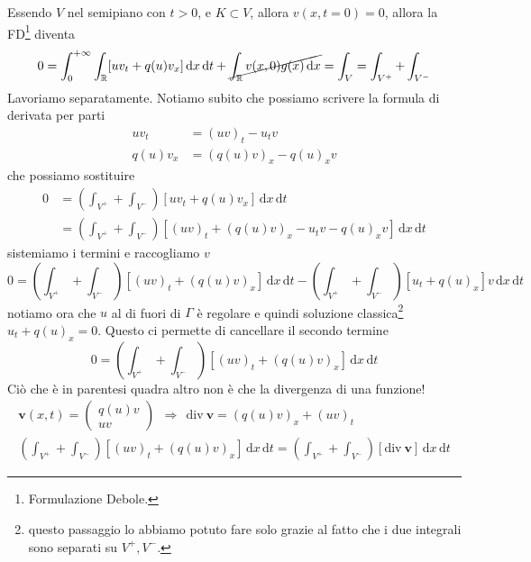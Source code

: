 \documentclass[10pt,a4paper,twoside,openright]{book}
\newcommand{\de}{\,\mathrm d}
\newcommand{\dx}{\de x}
\newcommand{\dt}{\de t}
\begin{document}
\begin{dimostrazione}
\begin{figure}[H]
\begin{tikzpicture}[x=0.75pt,y=0.75pt,yscale=-1,xscale=1]
		\end{tikzpicture}
	\end{figure}
	\FloatBarrier

	Essendo $V$ nel semipiano con $t >0$, e $K\subset V$, allora $v(x,t=0) =0$, allora la FD\footnote{Formulazione Debole.} diventa
	\begin{equation*}
		0=\int ^{+\infty }_{0}\int _{\mathbb{R}}[ uv_{t} +q(u) v_{x}] \dx\dt+\cancel{\int _{\mathbb{R}} v(x,0) g(x) \dx} =\int _{V} =\int _{V^{+}} +\int _{V^{-}}
	\end{equation*}
	Lavoriamo separatamente. Notiamo subito che possiamo scrivere la formula di derivata per parti
	\begin{align*}
		uv_{t}      & =(uv)_{t} -u_{t} v          \\
		q(u) v_{x} & =(q(u) v)_{x} -q(u)_{x} v 
	\end{align*}
	che possiamo sostituire
	\begin{align*}
		0 & =\left(\int _{V^{+}} +\int _{V^{-}}\right)[ uv_{t} +q(u) v_{x}] \dx\dt                           \\
		  & =\left(\int _{V^{+}} +\int _{V^{-}}\right)[(uv)_{t} +(q(u) v)_{x} -u_{t} v-q(u)_{x} v] \dx\dt 
	\end{align*}
	sistemiamo i termini e raccogliamo $v$
	\begin{equation*}
		0=\left(\int _{V^{+}} +\int _{V^{-}}\right)[(uv)_{t} +(q(u) v)_{x}] \dx\dt-\left(\int _{V^{+}} +\int _{V^{-}}\right)[ u_{t} +q(u)_{x}] v\dx\dt
	\end{equation*}
	notiamo ora che $u$ al di fuori di $\Gamma $ è regolare e quindi soluzione classica\footnote{questo passaggio lo abbiamo potuto fare solo grazie al fatto che i due integrali sono separati su $V^{+} ,V^{-}$.} $u_{t} +q(u)_{x} =0$. Questo ci permette di cancellare il secondo termine
	\begin{equation*}
		0=\left(\int _{V^{+}} +\int _{V^{-}}\right)[(uv)_{t} +(q(u) v)_{x}] \dx\dt
	\end{equation*}
	Ciò che è in parentesi quadra altro non è che la divergenza di una funzione!
	\begin{gather*}
		\mathbf{v}(x,t) =
		\begin{pmatrix}
			q(u) v \\
			uv      
		\end{pmatrix} \ \ \Rightarrow \ \ \mathrm{div} \ \mathbf{v} =(q(u) v)_{x} +(uv)_{t}\\
		\left(\int _{V^{+}} +\int _{V^{-}}\right)[(uv)_{t} +(q(u) v)_{x}] \dx\dt=\left(\int _{V^{+}} +\int _{V^{-}}\right)[\mathrm{div} \ \mathbf{v}] \dx\dt

\end{gather*}
\end{dimostrazione}
\end{document}

